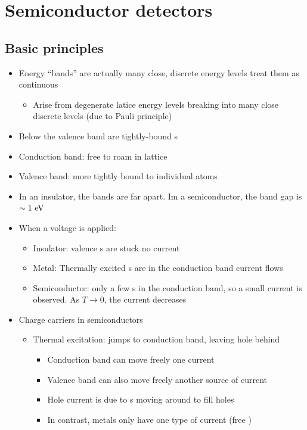 \section{Semiconductor detectors}
\subsection{Basic principles}
\begin{itemize}
  \item Energy ``bands'' are actually many close, discrete energy levels \thus treat them as continuous
  \begin{itemize}
    \item Arise from degenerate latice energy levels breaking into many close discrete levels (due to Pauli principle)
  \end{itemize}
  \item Below the valence band are tightly-bound \el s
  \item Conduction band: free to roam in lattice
  \item Valence band: more tightly bound to individual atoms
  \item In an insulator, the bands are far apart. Im a semiconductor, the band gap is $\sim 1~\text{eV}$
  \item When a voltage is applied:
  \begin{itemize}
    \item Insulator: valence \el s are stuck \thus no current
    \item Metal: Thermally excited \el s are in the conduction band \thus current flows
    \item Semiconductor: only a few \el s in the conduction band, so a small current is observed. As $T\rightarrow 0$, the current decreases
  \end{itemize}
  \item Charge carriers in semiconductors
  \begin{itemize}
    \item Thermal excitation: \el jumps to conduction band, leaving hole behind
    \begin{itemize}
      \item Conduction band \el can move freely \thus one current
      \item Valence band can also move freely \thus another source of current
      \item Hole current is due to \el s moving around to fill holes
      \item In contrast, metals only have one type of current (free \el)

\end{itemize}
\end{itemize}
\end{itemize}
